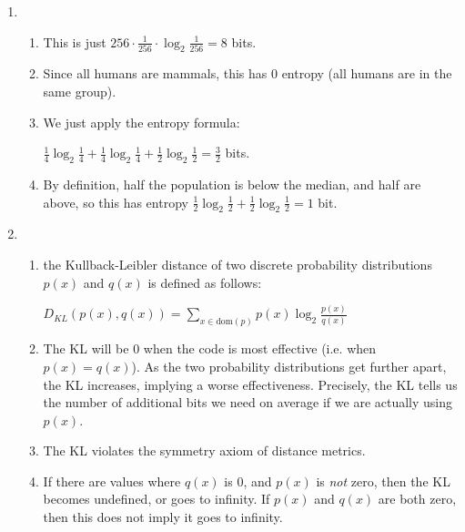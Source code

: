 



\begin{enumerate}[label=(\alph*)]
  \item
    \begin{enumerate}[label=(\roman*)]

      \item
        This is just $256 \cdot \frac{1}{256} \cdot \log_2 {\frac{1}{256}} = 8$ bits.

      \item
        Since all humans are mammals, this has 0 entropy (all humans are in the same group).

      \item
        We just apply the entropy formula:

        $\frac{1}{4}\log_2 \frac{1}{4} + \frac{1}{4}\log_2 \frac{1}{4} + \frac{1}{2}\log_2 \frac{1}{2} = \frac{3}{2}$ bits.

      \item
        By definition, half the population is below the median, and half are above, so this has entropy $\frac{1}{2}\log_2 \frac{1}{2} + \frac{1}{2}\log_2 \frac{1}{2} = 1$ bit.

        
    \end{enumerate}

  \item
    \begin{enumerate}[label=(\alph*)]
      \item
        the Kullback-Leibler distance of two discrete probability distributions $p(x)$ and $q(x)$ is defined as follows:

        $D_{KL}(p(x), q(x)) = \sum_{x \in \text{dom}(p)} p(x) \log_2 \frac{p(x)}{q(x)}$

      \item
        The KL will be 0 when the code is most effective (i.e. when $p(x) = q(x)$). As the two probability distributions get further apart, the KL increases, implying a worse effectiveness. Precisely, the KL tells us the number of additional bits we need on average if we are actually using $p(x)$.

      \item
        The KL violates the symmetry axiom of distance metrics.

      \item
        If there are values where $q(x)$ is 0, and $p(x)$ is \textit{not} zero, then the KL becomes undefined, or goes to infinity. If $p(x)$ and $q(x)$ are both zero, then this does not imply it goes to infinity.
        

\end{enumerate}
\end{enumerate}
